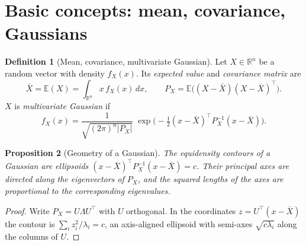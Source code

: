 \documentclass[11pt,a4paper]{article}
\def\boldsymbol#1{#1}%
\def\mathbf#1{#1}%
\newcommand{\Rn}{\mathbb{R}}
\newcommand{\E}{\mathbb{E}}
\newcommand{\tp}{^{\top}}
\newcommand{\bx}{\boldsymbol{x}}
\newcommand{\mP}{\mathbf{P}}
\newcommand{\slides}[1]{\texorpdfstring{\hspace{0.5em}{\normalfont\small\emph{(#1)}}}{}}
\theoremstyle{definition}
\newtheorem{definition}{Definition}[section]
\theoremstyle{plain}
\newtheorem{proposition}[definition]{Proposition}
\theoremstyle{remark}
\begin{document}
\section{Basic concepts: mean, covariance, Gaussians \slides{EKF deck, slides 3--4}}

\begin{definition}[Mean, covariance, multivariate Gaussian]
Let $\boldsymbol X\in\Rn^n$ be a random vector with density $f_{\boldsymbol X}(\bx)$. Its \emph{expected value} and
\emph{covariance matrix} are
\[
\bar{\boldsymbol X}=\E(\boldsymbol X)=\int_{\Rn^n}\bx\,f_{\boldsymbol X}(\bx)\,d\bx,\qquad
\mP_X=\E\big((\boldsymbol X-\bar{\boldsymbol X})(\boldsymbol X-\bar{\boldsymbol X})\tp\big).
\]
$\boldsymbol X$ is \emph{multivariate Gaussian} if
\[
f_{\boldsymbol X}(\bx)=\frac{1}{\sqrt{(2\pi)^n|\mP_X|}}\;
\exp\!\Big(-\tfrac12(\bx-\bar{\boldsymbol X})\tp\mP_X^{-1}(\bx-\bar{\boldsymbol X})\Big).
\]
\end{definition}

\begin{proposition}[Geometry of a Gaussian]\label{prop:ellipse}
The equidensity contours of a Gaussian are ellipsoids $(\bx-\bar{\boldsymbol X})\tp\mP_X^{-1}(\bx-\bar{\boldsymbol X})=c$.
Their principal axes are directed along the eigenvectors of $\mP_X$, and the squared lengths of the axes are
proportional to the corresponding eigenvalues.
\end{proposition}
\begin{proof}
Write $\mP_X=\mathbf U\boldsymbol\Lambda\mathbf U\tp$ with $\mathbf U$ orthogonal. In the coordinates
$\boldsymbol z=\mathbf U\tp(\bx-\bar{\boldsymbol X})$ the contour is $\sum_i z_i^2/\lambda_i=c$, an axis-aligned ellipsoid
with semi-axes $\sqrt{c\lambda_i}$ along the columns of $\mathbf U$.
\end{proof}
\end{document}
